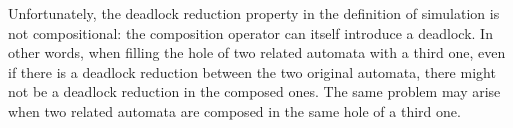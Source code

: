 \documentclass[runningheads]{llncs}
\begin{document}

Unfortunately, the deadlock reduction property in the definition of simulation is not compositional: the composition operator can itself introduce a deadlock. In other words, when filling the hole of two related automata with a third one, even if there is a deadlock reduction between the two original automata, there might not be a deadlock reduction in the composed ones. The same problem may arise when two related automata are composed in the same hole of a third one. 
\end{document}
